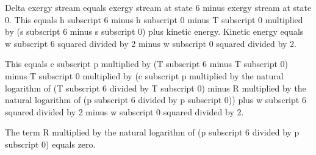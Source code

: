 Delta exergy stream equals exergy stream at state 6 minus exergy stream at state 0.  
This equals h subscript 6 minus h subscript 0 minus T subscript 0 multiplied by (s subscript 6 minus s subscript 0) plus kinetic energy.  
Kinetic energy equals w subscript 6 squared divided by 2 minus w subscript 0 squared divided by 2.  

This equals c subscript p multiplied by (T subscript 6 minus T subscript 0) minus T subscript 0 multiplied by (c subscript p multiplied by the natural logarithm of (T subscript 6 divided by T subscript 0) minus R multiplied by the natural logarithm of (p subscript 6 divided by p subscript 0)) plus w subscript 6 squared divided by 2 minus w subscript 0 squared divided by 2.  

The term R multiplied by the natural logarithm of (p subscript 6 divided by p subscript 0) equals zero.
